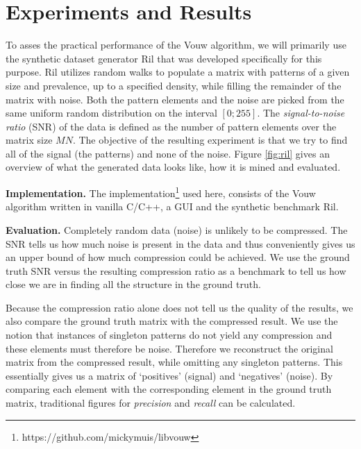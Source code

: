 \documentclass{llncs}
\begin{document}
\section{Experiments and Results}

To asses the practical performance of the Vouw algorithm, we will primarily use the synthetic dataset generator Ril that was developed specifically for this purpose. Ril utilizes random walks to populate a matrix with patterns of a given size and prevalence, up to a specified density, while filling the remainder of the matrix with noise. Both the pattern elements and the noise are picked from the same uniform random distribution on the interval $[0;255]$. The \emph{signal-to-noise ratio} (SNR) of the data is defined as the number of pattern elements over the matrix size $MN$. The objective of the resulting experiment is that we try to find all of the signal (the patterns) and none of the noise. Figure \ref{fig:ril} gives an overview of what the generated data looks like, how it is mined and evaluated.

\smallskip \noindent \textbf{Implementation.} %
The implementation\footnote{https://github.com/mickymuis/libvouw} used here, consists of the Vouw algorithm written in vanilla C/C++, a GUI and the synthetic benchmark Ril. 

\smallskip \noindent \textbf{Evaluation.} %
Completely random data (noise) is unlikely to be compressed. The SNR tells us how much noise is present in the data and thus conveniently gives us an upper bound of how much compression could be achieved. We use the ground truth SNR versus the resulting compression ratio as a benchmark to tell us how close we are in finding all the structure in the ground truth. 

Because the compression ratio alone does not tell us the quality of the results, we also compare the ground truth matrix with the compressed result. We use the notion that instances of singleton patterns do not yield any compression and these elements must therefore be noise. Therefore we reconstruct the original matrix from the compressed result, while omitting any singleton patterns. This essentially gives us a matrix of `positives' (signal) and `negatives' (noise). By comparing each element with the corresponding element in the ground truth matrix, traditional figures for \emph{precision} and \emph{recall} can be calculated.
\end{document}
